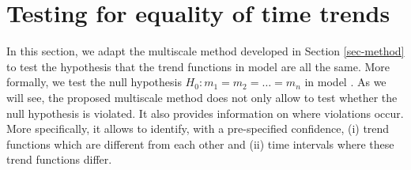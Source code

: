 \documentclass[a4paper,12pt]{article}
\makeatletter
\renewcommand{\eqref}[1]{\tagform@{\ref{#1}}}
\makeatother
\begin{document}
\section{Testing for equality of time trends}\label{sec-test-equality}

In this section, we adapt the multiscale method developed in Section \ref{sec-method} to test the hypothesis that the trend functions in model \eqref{model} are all the same. More formally, we test the null hypothesis $H_0: m_1 = m_2 = \ldots = m_n$ in model \eqref{model_full}. As we will see, the proposed multiscale method does not only allow to test whether the null hypothesis is violated. It also provides information on where violations occur. More specifically, it allows to identify, with a pre-specified confidence, (i) trend functions which are different from each other and (ii) time intervals where these trend functions differ.
\end{document}
